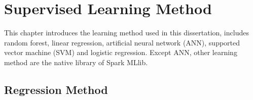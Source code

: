 \chapter{Supervised Learning Method}
\label{ch:machine}

This chapter introduces the learning method used in this dissertation, includes random forest, linear regression, artificial neural network (ANN), supported vector machine (SVM) and logistic regression. Except ANN, other learning method are the native library of Spark MLlib.


\section{Regression Method}
